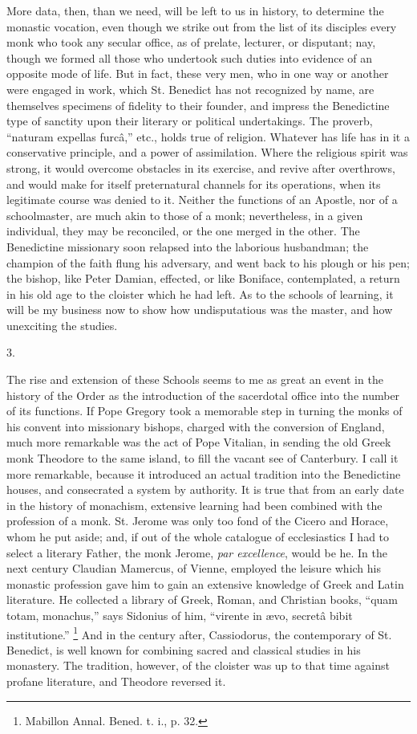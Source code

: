 More data, then, than we need, will be left to us in history, to
determine the monastic vocation, even though we strike out from the
list of its disciples every monk who took any secular office, as of
prelate, lecturer, or disputant; nay, though we formed all those who
undertook such duties into evidence of an opposite mode of life. But
in fact, these very men, who in one way or another were engaged in
work, which St. Benedict has not recognized by name, are themselves
specimens of fidelity to their founder, and impress the Benedictine
type of sanctity upon their literary or political undertakings. The
proverb, ``naturam expellas furcâ,'' etc., holds true of
religion. Whatever has life has in it a conservative principle, and a
power of assimilation. Where the religious spirit was strong, it would
overcome obstacles in its exercise, and revive after overthrows, and
would make for itself preternatural channels for its operations, when
its legitimate course was denied to it. Neither the functions of an
Apostle, nor of a schoolmaster, are much akin to those of a
monk; nevertheless, in a given individual, they may be reconciled, or
the one merged in the other. The Benedictine missionary soon relapsed
into the laborious husbandman; the champion of the faith flung his
adversary, and went back to his plough or his pen; the bishop, like
Peter Damian, effected, or like Boniface, contemplated, a return in
his old age to the cloister which he had left. As to the schools of
learning, it will be my business now to show how undisputatious was
the master, and how unexciting the studies.

3.

The rise and extension of these Schools seems to me as great an
event in the history of the Order as the introduction of the
sacerdotal office into the number of its functions. If Pope Gregory
took a memorable step in turning the monks of his convent into
missionary bishops, charged with the conversion of England, much more
remarkable was the act of Pope Vitalian, in sending the old Greek monk
Theodore to the same island, to fill the vacant see of Canterbury. I
call it more remarkable, because it introduced an actual tradition
into the Benedictine houses, and consecrated a system by authority. It
is true that from an early date in the history of monachism, extensive
learning had been combined with the profession of a monk. St. Jerome
was only too fond of the Cicero and Horace, whom he put aside; and, if
out of the whole catalogue of ecclesiastics I had to select a literary
Father, the monk Jerome, \emph{par excellence}, would be he. In the
next century Claudian Mamercus, of Vienne, employed the leisure which
his monastic profession gave him to gain an extensive knowledge of
Greek and Latin literature. He collected a library of Greek, Roman, and Christian books, ``quam totam, monachus,'' says
Sidonius of him, ``virente in ævo, secretâ bibit institutione.''
\footnote{Mabillon
Annal. Bened. t. i., p. 32.} And in the century
after, Cassiodorus, the contemporary of St. Benedict, is well known
for combining sacred and classical studies in his monastery. The
tradition, however, of the cloister was up to that time against
profane literature, and Theodore reversed it.


